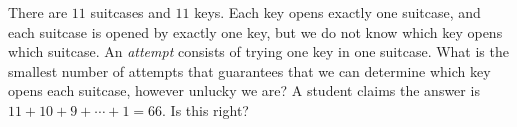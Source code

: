 There are $11$ suitcases and $11$ keys. Each key opens exactly one suitcase, and each suitcase is opened by exactly one key, but we do not know which key opens which suitcase. An \emph{attempt} consists of trying one key in one suitcase. What is the smallest number of attempts that guarantees that we can determine which key opens each suitcase, however unlucky we are? A student claims the answer is $11+10+9+\cdots+1=66$. Is this right?
